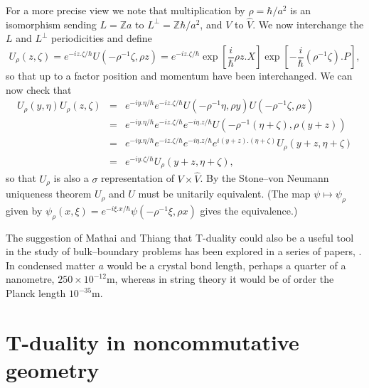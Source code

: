\documentclass[11pt]{article}
\newcommand{\integer}{{\mathbb Z}}
\newcommand{\wh}[1]{\widehat{#1}}
\begin{document}
For a more precise view we note that  multiplication by $\rho = \hbar/a^2$ is an isomorphism sending $L = \integer a$ to $L^\perp = \integer\hbar/a^2$, and $V$ to $\wh{V}$.
We now interchange the $L$ and $L^\perp$ periodicities and define
$$
U_\rho(z,\zeta) = e^{-iz.\zeta/\hbar} U(-\rho^{-1}\zeta,\rho z) = e^{-iz.\zeta/\hbar}\exp\left[ \frac{i}{\hbar}\rho z.X\right]\exp\left[ -\frac{i}{\hbar}(\rho^{-1}\zeta).P\right],
$$
so that up to a factor position and momentum have been interchanged. We can now check that 
\begin{eqnarray*}
U_\rho(y,\eta)U_\rho(z,\zeta) &=& e^{-iy.\eta/\hbar}e^{-iz.\zeta/\hbar} U(-\rho^{-1}\eta,\rho y) U(-\rho^{-1}\zeta,\rho z)\\
&=& e^{-iy.\eta/\hbar}e^{-iz.\zeta/\hbar} e^{-i\eta.z/\hbar}U(-\rho^{-1}(\eta+\zeta),\rho (y+z))\\
&=& e^{-iy.\eta/\hbar}e^{-iz.\zeta/\hbar} e^{-i\eta.z/\hbar}e^{i(y+z).(\eta+\zeta)}U_\rho(y+z,\eta+\zeta)\\
&=& e^{-iy.\zeta/\hbar}U_\rho(y+z,\eta+\zeta),
\end{eqnarray*}
so that $U_\rho$ is also a $\sigma$ representation of $V\times \wh{V}$. By the Stone--von Neumann uniqueness theorem $U_\rho$ and $U$ must be unitarily equivalent. (The map $\psi \mapsto \psi_\rho$ given by $\psi_\rho(x,\xi) = e^{-i\xi.x/\hbar}\psi(-\rho^{-1}\xi,\rho x)$ gives the equivalence.)

The suggestion of Mathai and Thiang that T-duality could also be a useful tool in the study of bulk--boundary problems has been explored in a series of papers, \cite{MT1, MT3,MT4,HMT16,HMT17}.
In condensed matter $a$ would be a crystal bond length, perhaps a quarter of a nanometre, $250\times 10^{-12}$m, whereas in string theory it  would be of order the Planck length $10^{-35}$m. 


%
%

\section{T-duality in noncommutative geometry}
\end{document}
